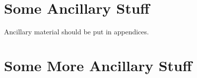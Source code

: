 \documentclass{uicthesi}
\begin{document}
\chapter{Some Ancillary Stuff}

Ancillary material should be put in appendices.

\chapter{Some More Ancillary Stuff}


\bibformb

\newpage
\end{document}
